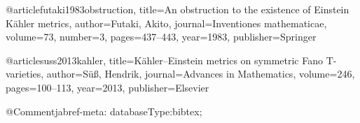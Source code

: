 @article{futaki1983obstruction,
  title={An obstruction to the existence of Einstein K{\"a}hler metrics},
  author={Futaki, Akito},
  journal={Inventiones mathematicae},
  volume={73},
  number={3},
  pages={437--443},
  year={1983},
  publisher={Springer}
}

@article{suss2013kahler,
  title={K{\"a}hler--Einstein metrics on symmetric Fano T-varieties},
  author={S{\"u}{\ss}, Hendrik},
  journal={Advances in Mathematics},
  volume={246},
  pages={100--113},
  year={2013},
  publisher={Elsevier}
}

@Comment{jabref-meta: databaseType:bibtex;}
